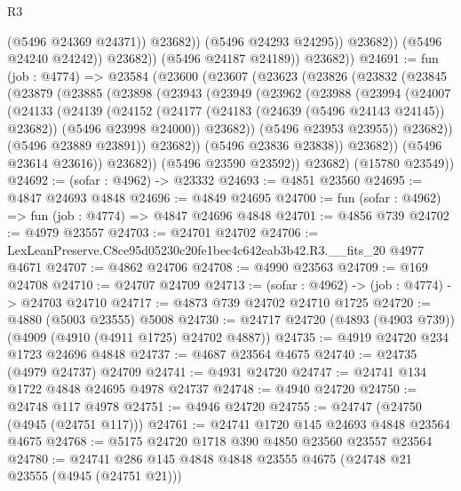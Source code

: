 \begin{lexlean}{R3}
\begin{coremodule}
                            (@5496 @24369 @24371))
                          @23682))
                      (@5496 @24293 @24295))
                    @23682))
                (@5496 @24240 @24242))
              @23682))
          (@5496 @24187 @24189))
        @23682))
@24691 := fun (job : @4774) =>
  @23584
    (@23600
      (@23607
        (@23623
          (@23826
            (@23832
              (@23845
                (@23879
                  (@23885
                    (@23898
                      (@23943
                        (@23949
                          (@23962
                            (@23988
                              (@23994
                                (@24007
                                  (@24133
                                    (@24139
                                      (@24152
                                        (@24177 (@24183 (@24639 (@5496 @24143 @24145)) @23682))
                                        (@5496 @23998 @24000))
                                      @23682))
                                  (@5496 @23953 @23955))
                                @23682))
                            (@5496 @23889 @23891))
                          @23682))
                      (@5496 @23836 @23838))
                    @23682))
                (@5496 @23614 @23616))
              @23682))
          (@5496 @23590 @23592))
        @23682)
      (@15780 @23549))
@24692 := (sofar : @4962) -> @23332
@24693 := @4851 @23560
@24695 := @4847 @24693 @4848
@24696 := @4849 @24695
@24700 := fun (sofar : @4962) => fun (job : @4774) => @4847 @24696 @4848
@24701 := @4856 @739
@24702 := @4979 @23557
@24703 := @24701 @24702
@24706 := LexLeanPreserve.C8ce95d05230c20fe1bec4c642eab3b42.R3.__fits_20 @4977 @4671
@24707 := @4862 @24706
@24708 := @4990 @23563
@24709 := @169 @24708
@24710 := @24707 @24709
@24713 := (sofar : @4962) -> (job : @4774) -> @24703 @24710
@24717 := @4873 @739 @24702 @24710 @1725
@24720 := @4880 (@5003 @23555) @5008
@24730 := @24717 @24720 (@4893 (@4903 @739)) (@4909 (@4910 (@4911 @1725) @24702 @4887))
@24735 := @4919 @24720 @234 @1723 @24696 @4848
@24737 := @4687 @23564 @4675
@24740 := @24735 (@4979 @24737) @24709
@24741 := @4931 @24720
@24747 := @24741 @134 @1722 @4848 @24695 @4978 @24737
@24748 := @4940 @24720
@24750 := @24748 @117 @4978
@24751 := @4946 @24720
@24755 := @24747 (@24750 (@4945 (@24751 @117)))
@24761 := @24741 @1720 @145 @24693 @4848 @23564 @4675
@24768 := @5175 @24720 @1718 @390 @4850 @23560 @23557 @23564
@24780 := @24741 @286 @145 @4848 @4848 @23555 @4675 (@24748 @21 @23555 (@4945 (@24751 @21)))

\end{coremodule}
\end{lexlean}
